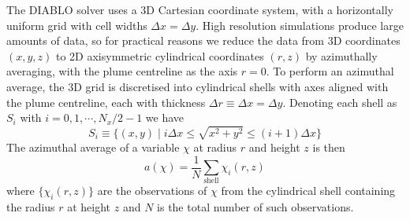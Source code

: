 \documentclass[a4paper]{article}
\begin{document}
The DIABLO solver uses a 3D Cartesian coordinate system, with a horizontally uniform grid with cell widths
$\Delta x = \Delta y$. High resolution simulations produce large amounts of data, so for practical reasons we
reduce the data from 3D coordinates $(x,y,z)$ to 2D axisymmetric cylindrical coordinates $(r,z)$ by
azimuthally averaging, with the plume centreline as the axis $r=0$. To perform an azimuthal average, the 3D
grid is discretised into cylindrical shells with axes aligned with the plume centreline, each with thickness
$\Delta r \equiv \Delta x = \Delta y$.  Denoting each shell as $S_i$ with $i=0,1, \cdots, N_x/2-1$ we have
\begin{equation}
	S_i \equiv \{ (x,y) \mid i\Delta x \le \sqrt{x^2 + y^2} \le (i+1)\Delta x\}
\end{equation}
The azimuthal average of a variable $\chi$ at radius $r$ and height $z$ is then
\begin{equation}
	a(\chi) = \frac{1}{N}\sum_{\text{shell}} \chi_i(r,z)
\end{equation}
where $\{\chi_i(r,z)\}$ are the observations of $\chi$ from the cylindrical shell containing the radius $r$ at
height $z$ and $N$ is the total number of such observations.
\end{document}
